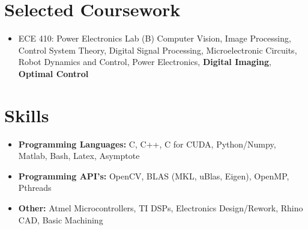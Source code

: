 \documentclass[line]{res}
\def\uiuc{University of Illinois at Urbana-Champaign}
\def\spaceline{\vspace{1mm} \fullline}
\begin{document}
\begin{resume}
\begin{itemize}
\end{itemize}




	\vspace{-3mm}
	\section{Selected Coursework}
	\begin{itemize}
	\item 
	\spaceline
	ECE 410: Power Electronics Lab (B)
	Computer Vision, Image Processing, Control System Theory, Digital Signal Processing, Microelectronic Circuits, Robot Dynamics and Control, Power Electronics, {\bf Digital Imaging}, {\bf Optimal Control}
	\end{itemize}

	\vspace{-3mm}
	\section{Skills}
	\begin{itemize}
	\item 
	\spaceline
{\bf Programming Languages: } C, C++, C for CUDA, Python/Numpy, Matlab, Bash, Latex, Asymptote
\item {\bf Programming API's: } OpenCV, BLAS (MKL, uBlas, Eigen), OpenMP, Pthreads
\item {\bf Other: } Atmel Microcontrollers, TI DSPs, Electronics Design/Rework, Rhino CAD, Basic Machining
\end{itemize}

		\end{resume}
		
\end{document}
